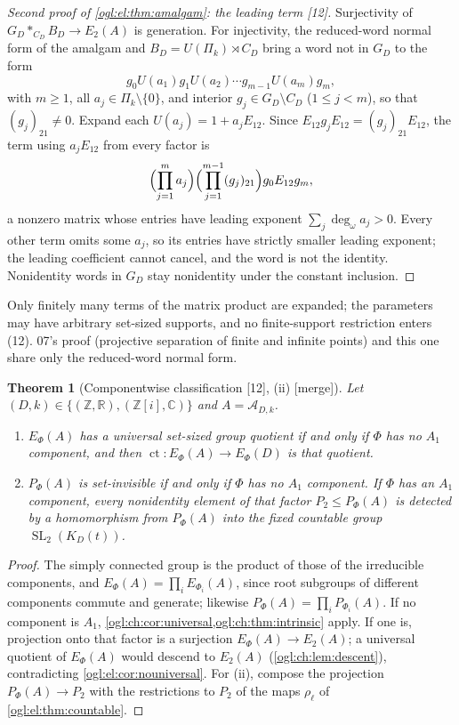 \documentclass[11pt,oneside]{article}
\numberwithin{equation}{section}
\newtheorem{theorem}{Theorem}[section]
\theoremstyle{definition}
\theoremstyle{remark}
\newcommand{\Z}{\mathbb Z}
\newcommand{\R}{\mathbb R}
\newcommand{\C}{\mathbb C}
\newcommand{\A}{\mathcal A}
\newcommand{\ct}{\operatorname{ct}}
\newcommand{\ddeg}{\operatorname{deg}_{\omega}}
\newcommand{\SL}{\operatorname{SL}}
\newcommand{\src}[1]{\textup{\textsf{\small[#1]}}}
\newcommand{\mergetag}{\textup{\textsf{\small[merge]}}}
\begin{document}
\begin{proof}[Second proof of \cref{ogl:el:thm:amalgam}: the leading term \src{12}]
Surjectivity of $G_D*_{C_D}B_D\to E_2(A)$ is generation. For injectivity, the
reduced-word normal form of the amalgam and $B_D=U(\Pi_k)\rtimes C_D$ bring a word
not in $G_D$ to the form
\begin{equation}\label{ogl:ch:eq:rankoneword}
 g_0U(a_1)g_1U(a_2)\cdots g_{m-1}U(a_m)g_m,
\end{equation}
with $m\ge1$, all $a_j\in\Pi_k\setminus\{0\}$, and interior $g_j\in G_D\setminus C_D$
($1\le j<m$), so that $(g_j)_{21}\ne0$. Expand each $U(a_j)=1+a_jE_{12}$. Since
$E_{12}g_jE_{12}=(g_j)_{21}E_{12}$, the term using $a_jE_{12}$ from every factor is
\begin{equation}\label{ogl:ch:eq:topword}
 \Bigl(\prod_{j=1}^ma_j\Bigr)\Bigl(\prod_{j=1}^{m-1}(g_j)_{21}\Bigr)g_0E_{12}g_m ,
\end{equation}
a nonzero matrix whose entries have leading exponent
$\sum_j\ddeg a_j>0$. Every other term omits some $a_j$, so its entries have
strictly smaller leading exponent; the leading coefficient cannot cancel, and
the word is not the identity. Nonidentity words in $G_D$ stay nonidentity under
the constant inclusion.
\end{proof}

Only finitely many terms of the matrix product are expanded; the parameters may
have arbitrary set-sized supports, and no finite-support restriction enters
(12). 07's proof (projective separation of finite and infinite points) and this
one share only the reduced-word normal form.

\begin{theorem}[Componentwise classification \src{12}, (ii) \mergetag]\label{ogl:ch:thm:components}
Let $(D,k)\in\{(\Z,\R),(\Z[i],\C)\}$ and $A=\A_{D,k}$.
\begin{enumerate}
\item $E_\Phi(A)$ has a universal set-sized group quotient if and only if $\Phi$
has no $A_1$ component, and then $\ct:E_\Phi(A)\to E_\Phi(D)$ is that quotient.
\item $P_\Phi(A)$ is set-invisible if and only if $\Phi$ has no $A_1$ component.
If $\Phi$ has an $A_1$ component, every nonidentity element of that factor
$P_2\le P_\Phi(A)$ is detected by a homomorphism from $P_\Phi(A)$ into the fixed
countable group $\SL_2(K_D(t))$.
\end{enumerate}
\end{theorem}
\begin{proof}
The simply connected group is the product of those of the irreducible
components, and $E_\Phi(A)=\prod_iE_{\Phi_i}(A)$, since root subgroups of different
components commute and generate; likewise $P_\Phi(A)=\prod_iP_{\Phi_i}(A)$. If no
component is $A_1$, \cref{ogl:ch:cor:universal,ogl:ch:thm:intrinsic} apply. If
one is, projection onto that factor is a surjection $E_\Phi(A)\to E_2(A)$; a
universal quotient of $E_\Phi(A)$ would descend to $E_2(A)$
(\cref{ogl:ch:lem:descent}), contradicting \cref{ogl:el:cor:nouniversal}. For
(ii), compose the projection $P_\Phi(A)\to P_2$ with the restrictions to $P_2$
of the maps $\rho_\ell$ of \cref{ogl:el:thm:countable}.
\end{proof}
\end{document}
